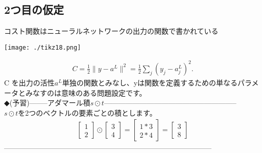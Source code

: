 \documentclass[11pt,a4paper,fleqn]{jsarticle}
\begin{document}
\subsection{2つ目の仮定}
コスト関数はニューラルネットワークの出力の関数で書かれている
    \begin{center}
        \texttt{[image: ./tikz18.png]} \\
    \end{center}
\begin{eqnarray}
  C = \frac{1}{2} \|y-a^L\|^2 = \frac{1}{2} \sum_j (y_j-a^L_j)^2.
\end{eqnarray}
C を出力の活性$a^L$単独の関数とみなし、yは関数を定義するための単なるパラメータとみなすのは意味のある問題設定です。\\

◆(予習)--------アダマール積$s \odot t$--------------------------------------------------------\\
$s \odot t$を2つのベクトルの要素ごとの積とします。
\begin{eqnarray}
\left[\begin{array}{c} 1 \\ 2 \end{array}\right]
  \odot \left[\begin{array}{c} 3 \\ 4\end{array} \right]
= \left[ \begin{array}{c} 1 * 3 \\ 2 * 4 \end{array} \right]
= \left[ \begin{array}{c} 3 \\ 8 \end{array} \right]
\end{eqnarray}
---------------------------------------------------------------------------------------\\
\end{document}
